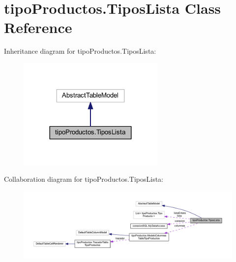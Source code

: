 \hypertarget{classtipo_productos_1_1_tipos_lista}{}\section{tipo\+Productos.\+Tipos\+Lista Class Reference}
\label{classtipo_productos_1_1_tipos_lista}


Inheritance diagram for tipo\+Productos.\+Tipos\+Lista\+:
\nopagebreak
\begin{figure}[H]
\begin{center}
\leavevmode
\includegraphics[width=204pt]{classtipo_productos_1_1_tipos_lista__inherit__graph}
\end{center}
\end{figure}


Collaboration diagram for tipo\+Productos.\+Tipos\+Lista\+:
\nopagebreak
\begin{figure}[H]
\begin{center}
\leavevmode
\includegraphics[width=350pt]{classtipo_productos_1_1_tipos_lista__coll__graph}
\end{center}
\end{figure}

